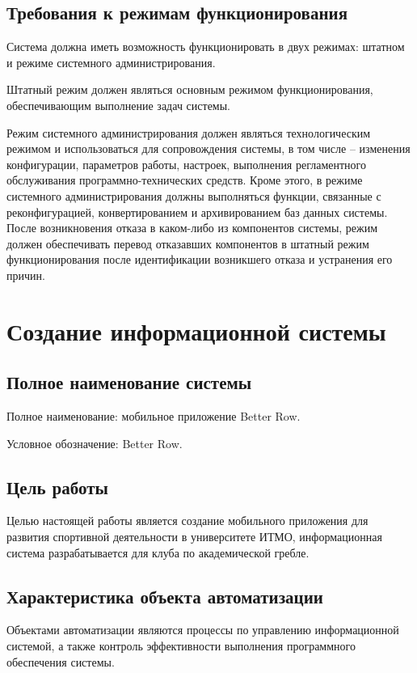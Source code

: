\documentclass[14pt]{extreport}
\begin{document}
\section{Требования к режимам функционирования}

Система должна иметь возможность функционировать в двух
режимах: штатном и режиме системного администрирования.

Штатный режим должен являться основным режимом
функционирования, обеспечивающим выполнение задач системы.

Режим системного администрирования должен являться технологическим
режимом и использоваться для сопровождения системы, в том числе –
изменения конфигурации, параметров работы, настроек, выполнения
регламентного обслуживания программно-технических средств. Кроме этого, в
режиме системного администрирования должны выполняться функции,
связанные с реконфигурацией, конвертированием и архивированием баз
данных системы. После возникновения отказа в каком-либо из компонентов
системы, режим должен обеспечивать перевод отказавших компонентов в
штатный режим функционирования после идентификации возникшего отказа и
устранения его причин.

\chapter{Создание информационной системы}

\section{Полное наименование системы}

Полное наименование: мобильное приложение Better Row.

Условное обозначение: Better Row.

\section{Цель работы}

Целью настоящей работы является создание мобильного приложения для развития спортивной деятельности в университете ИТМО, информационная система разрабатывается для клуба по академической гребле.

\section{Характеристика объекта автоматизации}

Объектами автоматизации являются процессы по управлению информационной системой, а также контроль эффективности выполнения программного обеспечения системы. 
\end{document}
